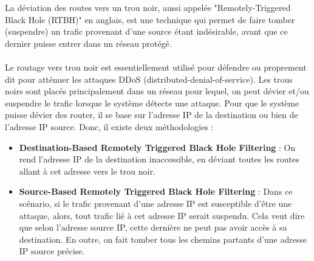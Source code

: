 La déviation des routes vers un trou noir, aussi appelée "Remotely-Triggered Black Hole (RTBH)" en anglais, est une technique qui permet de faire tomber (suspendre) un trafic provenant d'une source étant indésirable, avant que ce dernier puisse entrer dans un réseau protégé.
\\
\\
Le routage vers trou noir est essentiellement utilisé pour défendre ou proprement dit pour atténuer les attaques DDoS (distributed-denial-of-service). Les trous noirs sont placés principalement dans un réseau pour lequel, on peut dévier et/ou suspendre le trafic lorsque le système détecte une attaque. 
\newline
Pour que le système puisse dévier des router, il se base sur l'adresse IP de la destination ou bien de l'adresse IP source. Donc, il existe deux méthodologies :
\\
\begin{itemize}
\item \textbf{Destination-Based Remotely Triggered Black Hole Filtering } : On rend l'adresse IP de la destination inaccessible, en déviant toutes les routes allant à cet adresse vers le trou noir.
\item \textbf{Source-Based Remotely Triggered Black Hole Filtering }
: Dans ce scénario, si le trafic provenant d'une adresse IP est susceptible d'être une attaque, alors, tout trafic lié à cet adresse IP serait suspendu. Cela veut dire que selon l'adresse source IP, cette dernière ne peut pas avoir accès à sa destination. En outre, on fait tomber tous les chemins partants d'une adresse IP source précise.   
\end{itemize}



